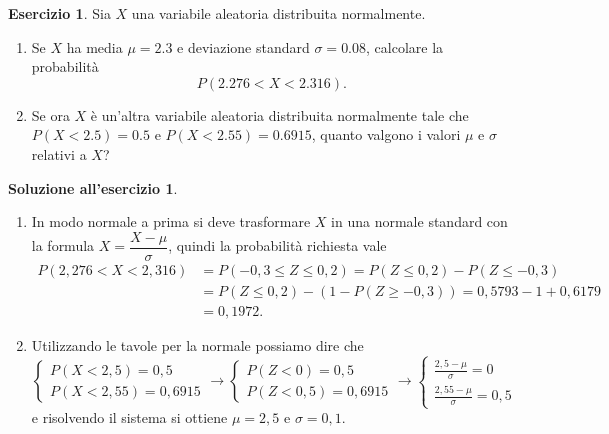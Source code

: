 \documentclass[12pt,a4paper]{article}
\theoremstyle{definition}
\newtheorem{sol}{Soluzione all'esercizio}
\newtheorem{exe}{Esercizio}
\begin{document}
\begin{exe}
	Sia $ X $ una variabile aleatoria distribuita normalmente.
	\begin{enumerate}
		\item  Se $ X $ ha media $ \mu = 2.3 $ e deviazione standard $ \sigma = 0.08 $, calcolare la probabilità
		      \[ P(2.276 < X < 2.316). \]
		\item  Se ora $ X $ è un'altra variabile aleatoria distribuita normalmente tale che $ P (X < 2.5) = 0.5 $ e $ P(X < 2.55) = 0.6915 $, quanto valgono i valori $ \mu $ e $ \sigma $ relativi a $ X $?
	\end{enumerate}
\end{exe}

\begin{sol}
	\begin{enumerate}
		\item In modo normale a prima si deve trasformare $ X $ in una normale standard con la formula $ X = \dfrac{X - \mu}{\sigma} $, quindi la probabilità richiesta vale
		      \[ \begin{split}
				      P(2,276 < X < 2,316) & = P(-0,3 \le Z \le 0,2) = P(Z \le 0,2) - P(Z \le -0,3)    \\
				                           & = P(Z \le 0,2) - (1 - P(Z \ge -0,3)) = 0,5793 -1 + 0,6179 \\
				                           & = 0,1972.
			      \end{split} \]
		\item Utilizzando le tavole per la normale possiamo dire che
		      \[ \begin{cases}
				      P(X < 2,5) = 0,5 \\
				      P(X < 2,55) = 0,6915
			      \end{cases} \to
			      \begin{cases}
				      P(Z < 0) = 0,5 \\
				      P(Z < 0,5) = 0,6915
			      \end{cases} \to
			      \begin{cases}
				      \frac{2,5 - \mu}{\sigma} = 0 \\
				      \frac{2,55-\mu}{\sigma} = 0,5
			      \end{cases} \]
		      e risolvendo il sistema si ottiene $ \mu = 2,5 $ e $ \sigma = 0,1 $.
	\end{enumerate}
\end{sol}
\end{document}
